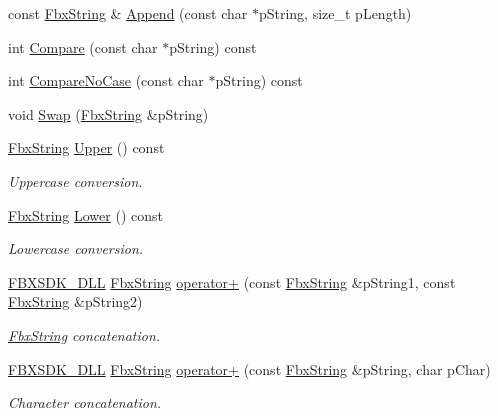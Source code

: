 \begin{DoxyCompactItemize}
\item 
const \hyperlink{class_fbx_string}{Fbx\+String} \& \hyperlink{class_fbx_string_a83fddd51fd69fee3f9dbde0e2caf6e94}{Append} (const char $\ast$p\+String, size\+\_\+t p\+Length)
\item 
int \hyperlink{class_fbx_string_a42ed521019bea60f8bc77079c41adc06}{Compare} (const char $\ast$p\+String) const
\item 
int \hyperlink{class_fbx_string_a8c7068a46cd93a53b982a97026cde255}{Compare\+No\+Case} (const char $\ast$p\+String) const
\item 
void \hyperlink{class_fbx_string_a12d620f75a2e54100374dbedfc786ae8}{Swap} (\hyperlink{class_fbx_string}{Fbx\+String} \&p\+String)
\item 
\hyperlink{class_fbx_string}{Fbx\+String} \hyperlink{class_fbx_string_ac8b1171ab4e292c7911f862ed7cc0939}{Upper} () const
\begin{DoxyCompactList}\small\item\em Uppercase conversion. \end{DoxyCompactList}\item 
\hyperlink{class_fbx_string}{Fbx\+String} \hyperlink{class_fbx_string_ad4ee2f69df02ceb7614910cf32b04653}{Lower} () const
\begin{DoxyCompactList}\small\item\em Lowercase conversion. \end{DoxyCompactList}\item 
\hyperlink{fbxarch_8h_a25d1298b33c31da5dbed969e0d4b4bc1}{F\+B\+X\+S\+D\+K\+\_\+\+D\+LL} \hyperlink{class_fbx_string}{Fbx\+String} \hyperlink{class_fbx_string_a2d28339557e99afdfe33ae62c80016c7}{operator+} (const \hyperlink{class_fbx_string}{Fbx\+String} \&p\+String1, const \hyperlink{class_fbx_string}{Fbx\+String} \&p\+String2)
\begin{DoxyCompactList}\small\item\em \hyperlink{class_fbx_string}{Fbx\+String} concatenation. \end{DoxyCompactList}\item 
\hyperlink{fbxarch_8h_a25d1298b33c31da5dbed969e0d4b4bc1}{F\+B\+X\+S\+D\+K\+\_\+\+D\+LL} \hyperlink{class_fbx_string}{Fbx\+String} \hyperlink{class_fbx_string_a900b603cd32d01c50eb97c3accdca223}{operator+} (const \hyperlink{class_fbx_string}{Fbx\+String} \&p\+String, char p\+Char)
\begin{DoxyCompactList}\small\item\em Character concatenation. \end{DoxyCompactList}\item 

\end{DoxyCompactItemize}
